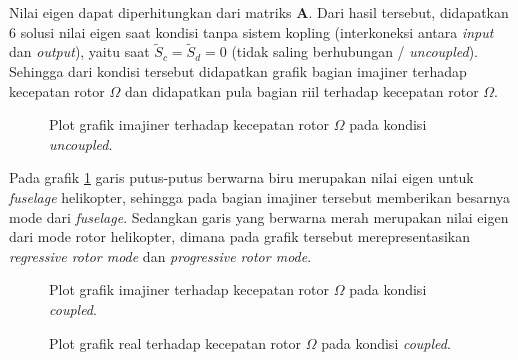 Nilai eigen dapat diperhitungkan dari matriks $\mathbf{A}$. Dari hasil tersebut, didapatkan 6 solusi nilai eigen saat kondisi tanpa sistem kopling (interkoneksi antara \textit{input} dan \textit{output}), yaitu saat $\tilde{S}_c = \tilde{S}_d = 0$ (tidak saling berhubungan / \textit{uncoupled}). Sehingga dari kondisi tersebut didapatkan grafik bagian imajiner terhadap kecepatan rotor $\Omega$ dan didapatkan pula bagian riil terhadap kecepatan rotor $\Omega$.

\begin{figure}[H]
	\centering
	\caption{Plot grafik imajiner terhadap kecepatan rotor $\Omega$ pada kondisi \textit{uncoupled}.}
	\label{fig:imag(uncoupled)}
\end{figure}

Pada grafik \ref{fig:imag(uncoupled)} garis putus-putus berwarna biru merupakan nilai eigen untuk \textit{fuselage} helikopter, sehingga pada bagian imajiner tersebut memberikan besarnya mode dari \textit{fuselage}. Sedangkan garis yang berwarna merah merupakan nilai eigen dari mode rotor helikopter, dimana pada grafik tersebut merepresentasikan \textit{regressive rotor mode} dan \textit{progressive rotor mode}. 

\begin{figure}[H]
	\centering
	\caption{Plot grafik imajiner terhadap kecepatan rotor $\Omega$ pada kondisi \textit{coupled}.}
	\label{fig:imag(coupled)}
\end{figure}

\begin{figure}[h]
	\centering
	\caption{Plot grafik real terhadap kecepatan rotor $\Omega$ pada kondisi \textit{coupled}.}
	\label{fig:real(coupled)}
\end{figure}

